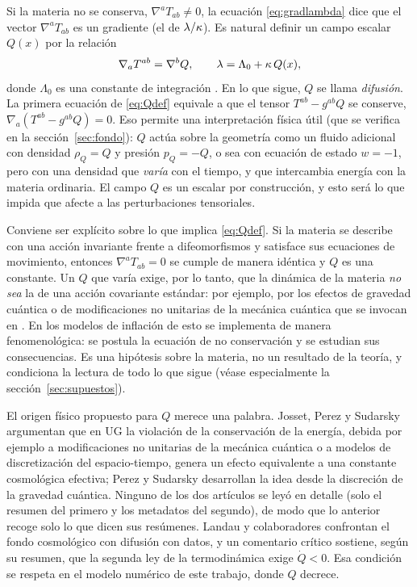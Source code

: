 Si la materia no se conserva, $\nabla^aT_{ab}\neq0$, la ecuación \eqref{eq:gradlambda} dice que el vector $\nabla^aT_{ab}$ es un gradiente (el de $\lambda/\kappa$). Es natural definir un campo escalar $Q(x)$ por la relación
\begin{equation}
\nabla_aT^{ab}=\nabla^bQ,\qquad \lambda=\Lambda_0+\kappa\,Q(x),
\label{eq:Qdef}
\end{equation}
donde $\Lambda_0$ es una constante de integración . En lo que sigue, $Q$ se llama \emph{difusión}. La primera ecuación de \eqref{eq:Qdef} equivale a que el tensor $T^{ab}-g^{ab}Q$ se conserve, $\nabla_a(T^{ab}-g^{ab}Q)=0$. Eso permite una interpretación física útil (que se verifica en la sección~\ref{sec:fondo}): $Q$ actúa sobre la geometría como un fluido adicional con densidad $\rho_Q=Q$ y presión $p_Q=-Q$, o sea con ecuación de estado $w=-1$, pero con una densidad que \emph{varía} con el tiempo, y que intercambia energía con la materia ordinaria. El campo $Q$ es un escalar por construcción, y esto será lo que impida que afecte a las perturbaciones tensoriales.

\begin{alerta}
Conviene ser explícito sobre lo que implica \eqref{eq:Qdef}. Si la materia se describe con una acción invariante frente a difeomorfismos y satisface sus ecuaciones de movimiento, entonces $\nabla^aT_{ab}=0$ se cumple de manera idéntica y $Q$ es una constante. Un $Q$ que varía exige, por lo tanto, que la dinámica de la materia \emph{no sea} la de una acción covariante estándar: por ejemplo, por los efectos de gravedad cuántica o de modificaciones no unitarias de la mecánica cuántica que se invocan en \cite{josset17,perez19}. En los modelos de inflación de \cite{leon22,piccirilli23} esto se implementa de manera fenomenológica: se postula la ecuación de no conservación y se estudian sus consecuencias. Es una hipótesis sobre la materia, no un resultado de la teoría, y condiciona la lectura de todo lo que sigue (véase especialmente la sección~\ref{sec:supuestos}).
\end{alerta}

El origen físico propuesto para $Q$ merece una palabra. Josset, Perez y Sudarsky \cite{josset17} argumentan que en UG la violación de la conservación de la energía, debida por ejemplo a modificaciones no unitarias de la mecánica cuántica o a modelos de discretización del espacio-tiempo, genera un efecto equivalente a una constante cosmológica efectiva; Perez y Sudarsky \cite{perez19} desarrollan la idea desde la discreción de la gravedad cuántica. Ninguno de los dos artículos se leyó en detalle (solo el resumen del primero y los metadatos del segundo), de modo que lo anterior recoge solo lo que dicen sus resúmenes. Landau y colaboradores \cite{landau23} confrontan el fondo cosmológico con difusión con datos, y un comentario crítico \cite{cataldo26} sostiene, según su resumen, que la segunda ley de la termodinámica exige $\dot Q<0$. Esa condición se respeta en el modelo numérico de este trabajo, donde $Q$ decrece.

